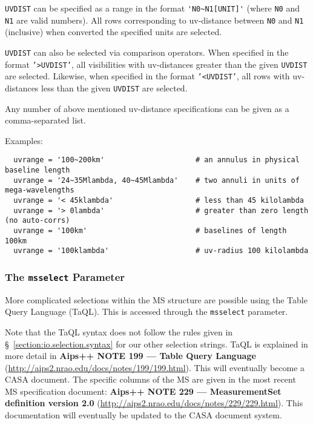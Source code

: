 {\tt UVDIST} can be specified as a range in the format 
{\verb!'N0~N1[UNIT]'!} (where {\tt N0} and {\tt N1} are valid numbers).  All
rows corresponding to uv-distance between {\tt N0} and {\tt N1}
(inclusive) when converted the specified units are selected.

{\tt UVDIST} can also be selected via comparison operators.  When specified in
the format {\tt '>UVDIST'}, all visibilities with uv-distances greater than the
given {\tt UVDIST} are selected.  Likewise, when specified in the
format {\tt '<UVDIST'}, all rows with uv-distances less than the given
{\tt UVDIST} are selected.


Any number of above mentioned uv-distance specifications can be given
as a comma-separated list.

Examples:
\small
\begin{verbatim}
  uvrange = '100~200km'                     # an annulus in physical baseline length
  uvrange = '24~35Mlambda, 40~45Mlambda'    # two annuli in units of mega-wavelengths
  uvrange = '< 45klambda'                   # less than 45 kilolambda 
  uvrange = '> 0lambda'                     # greater than zero length (no auto-corrs)
  uvrange = '100km'                         # baselines of length 100km
  uvrange = '100klambda'                    # uv-radius 100 kilolambda
\end{verbatim}
\normalsize


\subsubsection{The {\tt msselect} Parameter}
\label{section:io.selection.selectdata.msselect}

More complicated selections within the MS structure are possible
using the Table Query Language (TaQL).  This is accessed through
the {\tt msselect} parameter.

Note that the TaQL syntax does not follow the rules given in 
\S~\ref{section:io.selection.syntax} for our other selection strings.
TaQL is explained in more detail in {\bf Aips++ NOTE 199 --- 
Table Query Language}
(\url{http://aips2.nrao.edu/docs/notes/199/199.html}).
This will eventually become a CASA document.  The specific 
columns of the MS are given in the most recent MS specification
document: {\bf Aips++ NOTE 229 --- MeasurementSet definition version 2.0}
(\url{http://aips2.nrao.edu/docs/notes/229/229.html}).
This documentation will eventually be updated to the CASA 
document system.

